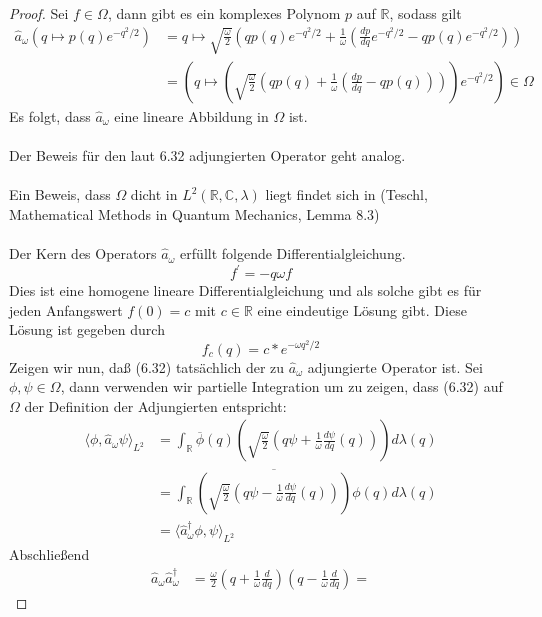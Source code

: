 \documentclass[11pt,a4paper,leqno]{report}
\numberwithin{equation}{chapter}
\begin{document}
\begin{proof}
	Sei $f\in\Omega$, dann gibt es ein komplexes Polynom $p$ auf $\mathbb{R}$, sodass gilt
	\begin{align*}
		\hat{a}_\omega (q\mapsto p(q)e^{-q^2/2}) &= q \mapsto \sqrt{\frac{\omega}{2}}(q p(q)e^{-q^2/2} +  \frac{1}{\omega}(\frac{dp}{dq}e^{-q^2/2} - q p(q)e^{-q^2/2}))\\&=(q \mapsto (\sqrt{\frac{\omega}{2}}(q p(q) +  \frac{1}{\omega}(\frac{dp}{dq} - q p(q))))e^{-q^2/2})\in \Omega
	\end{align*}
Es folgt, dass $\hat{a}_\omega$ eine lineare Abbildung in $\Omega$ ist. \\
\\
Der Beweis f\"ur den laut 6.32 adjungierten Operator geht analog.\\
\\
Ein Beweis, dass $\Omega$ dicht in $L^2(\mathbb{R}, \mathbb{C},\lambda)$ liegt findet sich in (Teschl, Mathematical Methods in Quantum Mechanics, Lemma 8.3)\\
\\
Der Kern des Operators $\hat{a}_\omega$ erf\"ullt folgende Differentialgleichung.
\begin{equation*}
	f^\prime=-q\omega f
\end{equation*}
Dies ist eine homogene lineare Differentialgleichung und als solche gibt es f\"ur jeden Anfangswert $f(0)=c$ mit $c\in \mathbb{R}$ eine eindeutige L\"osung gibt. Diese L\"osung ist gegeben durch
\begin{equation*}
	f_c(q) = c * e^{-\omega q^2 / 2}
\end{equation*}
Zeigen wir nun, da\ss{} (6.32) tats\"achlich der zu $\hat{a}_\omega$ adjungierte Operator ist.
Sei $\phi, \psi \in \Omega$, dann verwenden wir partielle Integration um zu zeigen, dass (6.32) auf $\Omega$ der Definition der Adjungierten entspricht:
\begin{align*}
	\langle \phi, \hat{a}_\omega\psi\rangle_{L^2} &= 
	\int_\mathbb{R} \overline{\phi}(q)( \sqrt{\frac{\omega}{2}}(q\psi +  \frac{1}{\omega}\frac{d\psi}{dq}(q)))d\lambda(q)\\&=
	\int_\mathbb{R} \overline{( \sqrt{\frac{\omega}{2}}(q\psi -  \frac{1}{\omega}\frac{d\psi}{dq}(q)))}\phi(q) d\lambda(q)\\&=\langle \hat{a}^\dagger_\omega\phi, \psi\rangle_{L^2}
\end{align*}
Abschlie\ss{}end
\begin{align*}
	\hat{a}_\omega\hat{a}_\omega^\dagger &= 
	\frac{\omega}{2}(q + \frac{1}{\omega}\frac{d}{dq})(q - \frac{1}{\omega}\frac{d}{dq})=

\end{align*}
\end{proof}
\end{document}
